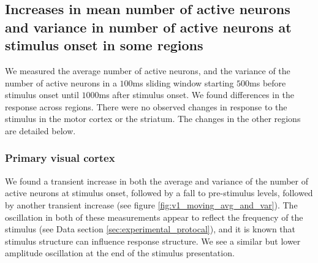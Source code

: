   \subsection{Increases in mean number of active neurons and variance in number of active neurons at stimulus onset in some regions}
  We measured the average number of active neurons, and the variance of the number of active neurons in a $100$ms sliding window starting $500$ms before stimulus onset until $1000$ms after stimulus onset. We found differences in the response across regions. There were no observed changes in response to the stimulus in the motor cortex or the striatum. The changes in the other regions are detailed below.

    \subsubsection{Primary visual cortex}
    We found a transient increase in both the average and variance of the number of active neurons at stimulus onset, followed by a fall to pre-stimulus levels, followed by another transient increase (see figure \ref{fig:v1_moving_avg_and_var}). The oscillation in both of these measurements appear to reflect the frequency of the stimulus (see Data section \ref{sec:experimental_protocal}), and it is known that stimulus structure can influence response structure\parencite{litwinkumar}. We see a similar but lower amplitude oscillation at the end of the stimulus presentation.

